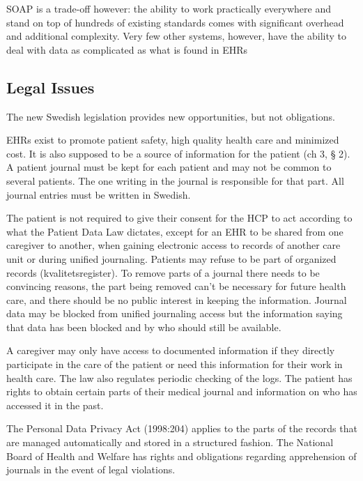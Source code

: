 \documentclass[14pt]{article}
\begin{document}
\gls{SOAP} is a trade-off however: the ability to work practically everywhere and stand on top of hundreds of existing standards comes with significant overhead and additional complexity. Very few other systems, however, have the ability to deal with data as complicated as what is found in \glspl{EHR}

\subsection{Legal Issues}
\label{sec:futureLegal}
The new Swedish legislation provides new opportunities, but not obligations. \cite{RiR19}

\glspl{EHR} exist to promote patient safety, high quality health care and minimized cost. It is also supposed to be a source of information for the patient (ch 3, § 2). A patient journal must be kept for each patient and may not be common to several patients. The one writing in the journal is responsible for that part. All journal entries must be written in Swedish. \cite{PatientDataAct}

The patient is not required to give their consent for the \gls{HCP} to act according to what the Patient Data Law dictates, except for an \gls{EHR} to be shared from one caregiver to another, when gaining electronic access to records of another care unit or during unified journaling. Patients may refuse to be part of organized records (kvalitetsregister). To remove parts of a journal there needs to be convincing reasons, the part being removed can't be necessary for future health care, and there should be no public interest in keeping the information. Journal data may be blocked from unified journaling access but the information saying that data has been blocked and by who should still be available. 

A caregiver may only have access to documented information if they directly participate in the care of the patient or need this information for their work in health care. The law also regulates periodic checking of the logs. The patient has rights to obtain certain parts of their medical journal and information on who has accessed it in the past.\cite{PatientDataAct}

The Personal Data Privacy Act (1998:204) applies to the parts of the records that are managed automatically and stored in a structured fashion. The National Board of Health and Welfare has rights and obligations regarding apprehension of journals in the event of legal violations.\cite{PatientDataAct}
\end{document}
